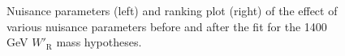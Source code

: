 \begin{figure}[H]
  \centering
  \caption{Nuisance parameters (left) and ranking plot (right) of the effect of various nuisance parameters before and after the fit for the 1400 GeV $W'_{\text{R}}$ mass hypotheses.}
  \label{fig:NuisParAndRanking_WpRH1400}
\end{figure}
